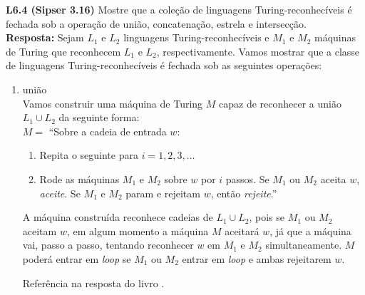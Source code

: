 
\noindent \textbf{L6.4 (Sipser 3.16)} Mostre que a coleção de linguagens Turing-reconhecíveis é fechada sob a operação de união, concatenação, estrela e intersecção.\\[6pt]
\textbf{Resposta: } Sejam $L_1$ e $L_2$ linguagens Turing-reconhecíveis e $M_1$ e $M_2$ máquinas de Turing que reconhecem $L_1$ e $L_2$, respectivamente. Vamos mostrar que a classe de linguagens Turing-reconhecíveis é fechada sob as seguintes operações:
\begin{enumerate}[label={\textbf{\alph*.}}]
    \item união\\[3pt]
    Vamos construir uma máquina de Turing $M$ capaz de reconhecer a união $L_1 \cup L_2$ da seguinte forma:\\[3pt]
    $M =$ “Sobre a cadeia de entrada $w$:
    \begin{enumerate}[label={\textbf{\arabic*.}}, leftmargin=1in]
        \item Repita o seguinte para $i = 1, 2, 3, \ldots$
    
        \item Rode as máquinas $M_1$ e $M_2$ sobre $w$ por $i$ passos. Se $M_1$ ou $M_2$ aceita $w$, \textit{aceite}. Se $M_1$ e $M_2$ param e rejeitam $w$, então \textit{rejeite}.”

    \end{enumerate}
    
    A máquina construída reconhece cadeias de $L_1 \cup L_2$, pois se $M_1$ ou $M_2$ aceitam $w$, em algum momento a máquina $M$ aceitará $w$, já que a máquina vai, passo a passo, tentando reconhecer $w$ em $M_1$ e $M_2$ simultaneamente. $M$ poderá entrar em \textit{loop} se $M_1$ ou $M_2$ entrar em \textit{loop} e ambas rejeitarem $w$.
    
    Referência na resposta do livro \cite{sipser:2006}.
    

\end{enumerate}
